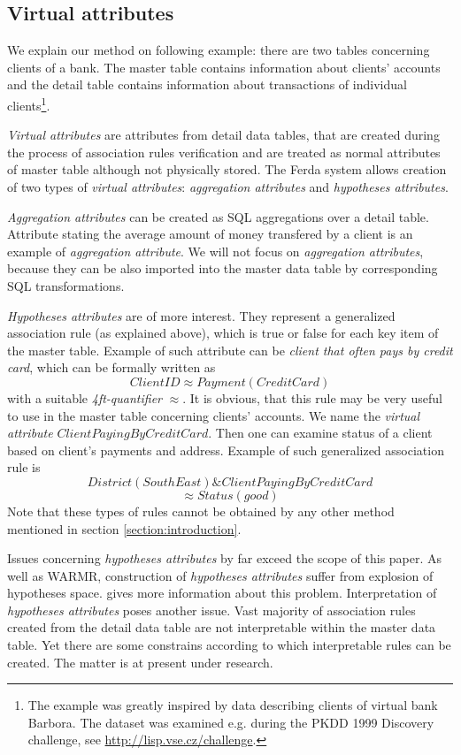 \documentclass[conference]{IEEEtran}
\begin{document}
\subsection{Virtual attributes}
\label{section:attributes}

We explain our method on following example: there are two tables concerning clients
of a bank. The master table contains information about clients' accounts and the detail 
table contains information about transactions of individual clients\footnote{The
example was greatly inspired by data describing clients of virtual bank Barbora. The
dataset was examined e.g. during the PKDD 1999 Discovery challenge, see 
\url{http://lisp.vse.cz/challenge}.}.

\emph{Virtual attributes} are attributes from detail data tables, that are created
during the process of association rules verification and are treated as normal attributes
of master table although not physically stored. The Ferda system allows creation of
two types of \emph{virtual attributes}: \emph{aggregation attributes} and \emph{hypotheses
attributes}. 

\emph{Aggregation attributes} can be created as SQL aggregations over
a detail table. Attribute stating the average amount of money transfered by a client
is an example of \emph{aggregation attribute}. We will not focus on \emph{aggregation
attributes}, because they can be also imported into the master data table by corresponding
SQL transformations.

\emph{Hypotheses attributes} are of more interest. They represent a generalized
association rule (as explained above), which is true or false for each key item
of the master table. Example of such attribute can be \emph{client that often
pays by credit card}, which can be formally written as 
$$ClientID \approx Payment(CreditCard)$$
with a suitable \emph{4ft-quantifier} $\approx$. It is obvious, that this rule
may be very useful to use in the master table concerning clients' accounts. We
name the \emph{virtual attribute} $ClientPayingByCreditCard$. Then one can 
examine status of a client based on client's payments and address. Example of
such generalized association rule is
$$District(SouthEast) \& ClientPayingByCreditCard$$
$$\approx Status(good)$$
Note that these types of rules cannot be obtained by any other method mentioned in
section \ref{section:introduction}.

Issues concerning \emph{hypotheses attributes} by far exceed the scope of this paper.
As well as WARMR, construction of \emph{hypotheses attributes} suffer from explosion
of hypotheses space. \cite{Karban} gives more information about this problem. 
Interpretation of \emph{hypotheses attributes} poses another issue. Vast
majority of association rules created from the detail data table are not interpretable
within the master data table. Yet there are some constrains according to which
interpretable rules can be created. The matter is at present under research. 
\end{document}
